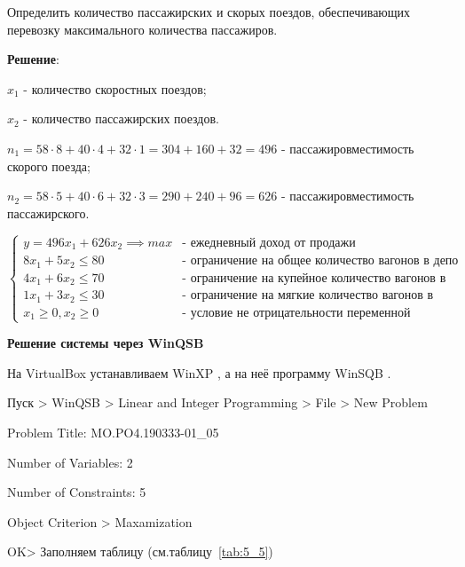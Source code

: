 Определить количество пассажирских и скорых поездов,
обеспечивающих перевозку максимального количества пассажиров.


\textbf{Решение}:

$x_1$ - количество скоростных поездов;

$x_2$ - количество пассажирских поездов.

$n_1 = 58\cdot 8 + 40\cdot 4 + 32\cdot 1 = 304 + 160 + 32 = 496$ - пассажировместимость скорого поезда;

$n_2 = 58\cdot 5 + 40\cdot 6 + 32\cdot 3 = 290 + 240 + 96 = 626$ - пассажировместимость пассажирского.

$$
\begin{cases}
  y = 496 x_1 + 626 x_2 \implies max &\text{- ежедневный доход от продажи}\\
  8 x_1 + 5 x_2 \leq 80 &\text{- ограничение на общее количество вагонов в депо}\\
  4 x_1 + 6 x_2 \leq 70 &\text{- ограничение на купейное количество вагонов в депо}\\
  1 x_1 + 3 x_2 \leq 30 &\text{- ограничение на мягкие количество вагонов в депо}\\
  x_1 \geq 0, x_2 \geq 0 &\text{- условие не отрицательности переменной}
\end{cases}
$$

\begin{center}
  \textbf{Решение системы через WinQSB}
\end{center}

На VirtualBox \cite{VirtualBox} устанавливаем WinXP \cite{WinXP}, а на неё программу WinSQB \cite{WinQSB}.

Пуск > WinQSB > Linear and Integer Programming > File > New Problem

Problem Title: MO.PO4.190333-01\_05

Number of Variables: 2

Number of Constraints: 5

Object Criterion > Maxamization

OK> Заполняем таблицу (см.таблицу~\ref{tab:5_5})

